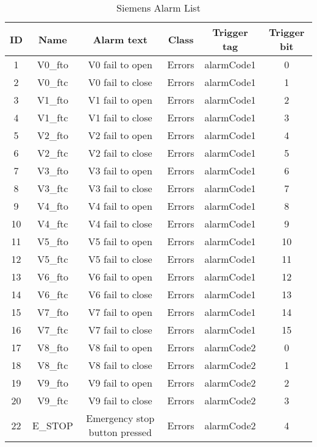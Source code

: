 

\begin{table}[H]
\caption{Siemens Alarm List}
\begin{center}
    \begin{tabular}{ |c|c|c|c|c|c| }
        \hline
        \textbf{ID}	& \textbf{Name}	& \textbf{Alarm text} &	\textbf{Class} & \textbf{Trigger tag} & \textbf{Trigger bit}\\ 
        \hline
        1 & V0\_fto & V0 fail to open &	Errors & alarmCode1	& 0\\
        2 &	V0\_ftc & V0 fail to close &	Errors & alarmCode1	& 1\\
        3 &	V1\_fto & V1 fail to open & Errors &	alarmCode1	& 2\\
        4 &	V1\_ftc & V1 fail to close &	Errors & alarmCode1	& 3\\
        5 &	V2\_fto & V2 fail to open &	Errors & alarmCode1	& 4\\
        6 &	V2\_ftc & V2 fail to close &	Errors & alarmCode1	& 5\\
        7 &	V3\_fto & V3 fail to open &	Errors & alarmCode1	& 6\\
        8 &	V3\_ftc & V3 fail to close &	Errors & alarmCode1	& 7\\
        9 &	V4\_fto & V4 fail to open &	Errors & alarmCode1	& 8\\
        10 & V4\_ftc & V4 fail to close & Errors	& alarmCode1 & 9\\
        11 & V5\_fto & V5 fail to open &	Errors & alarmCode1	& 10\\
        12 & V5\_ftc & V5 fail to close & Errors	& alarmCode1 & 11\\
        13 & V6\_fto & V6 fail to open &	Errors & alarmCode1	& 12\\
        14 & V6\_ftc & V6 fail to close & Errors & alarmCode1 & 13\\
        15 & V7\_fto & V7 fail to open &	Errors & alarmCode1	& 14\\
        16 & V7\_ftc & V7 fail to close & Errors	& alarmCode1 & 15\\
        17 & V8\_fto & V8 fail to open &	Errors & alarmCode2	& 0\\
        18 & V8\_ftc & V8 fail to close & Errors	& alarmCode2 & 1\\
        19 & V9\_fto & V9 fail to open &	Errors & alarmCode2	& 2\\
        20 & V9\_ftc & V9 fail to close & Errors	& alarmCode2 & 3\\
        22 & E\_STOP & Emergency stop button pressed	& Errors & alarmCode2 & 4\\
        \hline
    \end{tabular}\\
\end{center}
\label{table:alarmList}
\end{table}

